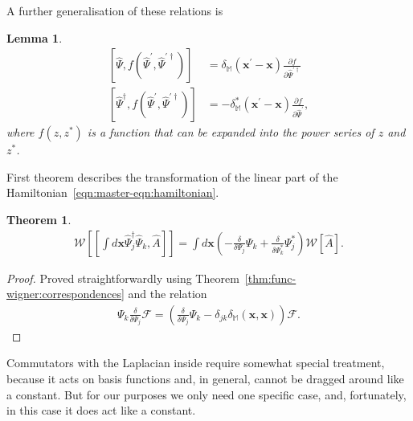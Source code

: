 \documentclass[12pt,aip,jmp,amssymb,amsmath]{revtex4-1}
\newtheorem{theorem}{Theorem}
\newtheorem{lemma}{Lemma}
\begin{document}
A further generalisation of these relations is

\begin{lemma}
\label{lmm:func-operators:functional-commutators}
    \begin{equation*}\begin{split}
        \left[ \hat{\Psi}, f( \hat{\Psi}^\prime, \hat{\Psi}^{\prime\dagger} ) \right]
        & = \delta_{\mathbb{M}} (\boldsymbol{x}^\prime - \boldsymbol{x}) \frac{\partial f}{\partial \hat{\Psi}^{\prime\dagger}} \\
        \left[ \hat{\Psi}^\dagger, f( \hat{\Psi}^\prime, \hat{\Psi}^{\prime\dagger} ) \right]
        & = -\delta_{\mathbb{M}}^* (\boldsymbol{x}^\prime - \boldsymbol{x}) \frac{\partial f}{\partial \hat{\Psi}^\prime},
    \end{split}\end{equation*}
    where $f(z, z^*)$ is a function that can be expanded into the power series of $z$ and $z^*$.
\end{lemma}

First theorem describes the transformation of the linear part of the Hamiltonian~\ref{eqn:master-eqn:hamiltonian}.

\begin{theorem}
\label{thm:transformations:w-commutator1}
    \begin{equation*}\begin{split}
        \mathcal{W} \left[ [\int d\boldsymbol{x} \hat{\Psi}_j^\dagger \hat{\Psi}_k, \hat{A}] \right]
        = \int d\boldsymbol{x} \left(
            - \frac{\delta}{\delta \Psi_j} \Psi_k
            + \frac{\delta}{\delta \Psi_k^*} \Psi_j^*
        \right) \mathcal{W}[\hat{A}].
    \end{split}\end{equation*}
\end{theorem}
\begin{proof}
Proved straightforwardly using Theorem~\ref{thm:func-wigner:correspondences} and the relation
\begin{equation}\begin{split}
    \Psi_k \frac{\delta}{\delta \Psi_j} \mathcal{F}
    = \left(
        \frac{\delta}{\delta \Psi_j} \Psi_k
        - \delta_{jk} \delta_{\mathbb{M}}(\boldsymbol{x}, \boldsymbol{x})
    \right) \mathcal{F}.
\end{split}\end{equation}
\end{proof}

Commutators with the Laplacian inside require somewhat special treatment, because it acts on basis functions and, in general, cannot be dragged around like a constant.
But for our purposes we only need one specific case, and, fortunately, in this case it does act like a constant.
\end{document}

